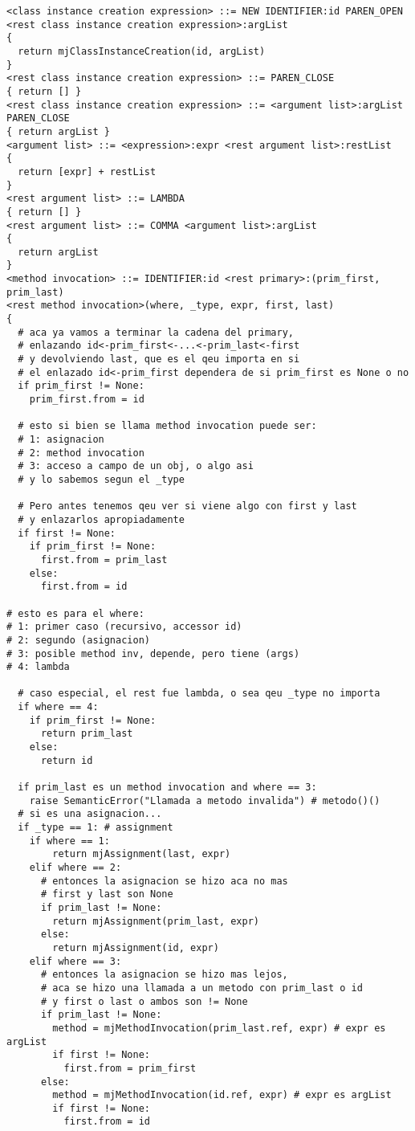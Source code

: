 \documentclass [a4paper,abstracton,titlepage]{scrartcl}
\begin{document}
\begin{lstlisting}
<class instance creation expression> ::= NEW IDENTIFIER:id PAREN_OPEN
<rest class instance creation expression>:argList
{
  return mjClassInstanceCreation(id, argList)
}
<rest class instance creation expression> ::= PAREN_CLOSE
{ return [] }
<rest class instance creation expression> ::= <argument list>:argList
PAREN_CLOSE
{ return argList }
<argument list> ::= <expression>:expr <rest argument list>:restList
{
  return [expr] + restList
}
<rest argument list> ::= LAMBDA
{ return [] }
<rest argument list> ::= COMMA <argument list>:argList
{
  return argList
}
<method invocation> ::= IDENTIFIER:id <rest primary>:(prim_first, prim_last)
<rest method invocation>(where, _type, expr, first, last)
{
  # aca ya vamos a terminar la cadena del primary,
  # enlazando id<-prim_first<-...<-prim_last<-first 
  # y devolviendo last, que es el qeu importa en si
  # el enlazado id<-prim_first dependera de si prim_first es None o no
  if prim_first != None:
    prim_first.from = id

  # esto si bien se llama method invocation puede ser:
  # 1: asignacion
  # 2: method invocation
  # 3: acceso a campo de un obj, o algo asi
  # y lo sabemos segun el _type

  # Pero antes tenemos qeu ver si viene algo con first y last
  # y enlazarlos apropiadamente
  if first != None:
    if prim_first != None:
      first.from = prim_last
    else:
      first.from = id

# esto es para el where:
# 1: primer caso (recursivo, accessor id)
# 2: segundo (asignacion)
# 3: posible method inv, depende, pero tiene (args)
# 4: lambda

  # caso especial, el rest fue lambda, o sea qeu _type no importa
  if where == 4:
    if prim_first != None:
      return prim_last
    else:
      return id

  if prim_last es un method invocation and where == 3:
    raise SemanticError("Llamada a metodo invalida") # metodo()()
  # si es una asignacion...
  if _type == 1: # assignment
    if where == 1:
        return mjAssignment(last, expr)
    elif where == 2:
      # entonces la asignacion se hizo aca no mas
      # first y last son None
      if prim_last != None:
        return mjAssignment(prim_last, expr)
      else:
        return mjAssignment(id, expr)
    elif where == 3:
      # entonces la asignacion se hizo mas lejos, 
      # aca se hizo una llamada a un metodo con prim_last o id
      # y first o last o ambos son != None
      if prim_last != None:
        method = mjMethodInvocation(prim_last.ref, expr) # expr es argList
        if first != None:
          first.from = prim_first
      else:
        method = mjMethodInvocation(id.ref, expr) # expr es argList
        if first != None:
          first.from = id


\end{lstlisting}
\end{document}
